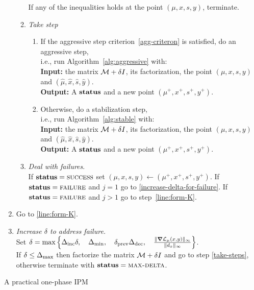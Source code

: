 \documentclass{article}
\begin{document}
\begin{algorithm}[H]
\begin{enumerate}[label*=A.{\arabic*}]
\begin{enumerate}[label*=.{\arabic*}]
If any of the inequalities \termination{} holds at the point $(\mu,x,s,y)$, terminate.
\item \emph{Take step}\label{line:take-step}
\begin{enumerate}[label=-Case {\Roman*}]
\item If the aggressive step criterion~\eqref{agg-criteron} is satisfied, do an aggressive step, \\
i.e., run Algorithm~\ref{alg:aggressive} with: \\
\hspace*{0.1cm}  \textbf{Input:} the matrix $\mathcal{M} + \delta I$, its factorization, the point $(\mu, x, s, y)$ and $(\hat{\mu}, \hat{x}, \hat{s}, \hat{y})$. \\
\hspace*{0.1cm}  \textbf{Output:} A $\textbf{status}$ and a new point $(\mu^{+},x^{+},s^{+},y^{+})$.
\item Otherwise, do a stabilization step, \\
i.e., run Algorithm~\ref{alg:stable} with: \\
\hspace*{0.1cm} \textbf{Input:} the matrix $\mathcal{M} + \delta I$, its factorization, the point $(\mu, x, s, y)$ and $(\hat{\mu}, \hat{x}, \hat{s}, \hat{y})$. \\
\hspace*{0.1cm} \textbf{Output:} A $\textbf{status}$ and a new point $(\mu^{+},x^{+},s^{+},y^{+})$.
\end{enumerate}
\item \emph{Deal with failures}. \\
If $\textbf{status} = \textsc{success}$ set $(\mu, x, s, y) \gets ( \mu^{+}, x^{+},s^{+},y^{+})$. If $\textbf{status} = \textsc{failure}$ and $j = 1$ go to \eqref{increase-delta-for-failure}.  If $\textbf{status} = \textsc{failure}$ and $j > 1$ go to step~\eqref{line:form-K}.
\end{enumerate}
\item 
Go to \eqref{line:form-K}.
\item \label{increase-delta-for-failure} \emph{Increase $\delta$ to address failure.} \\
Set $\delta = \max\left\{\Delta_{\text{inc}} \delta, \quad \Delta_{\min}, \quad \delta_{\text{prev}} \Delta_{\text{dec}}, \quad \frac{\| \grad \mathcal{L}_{\mu}(x,y) \|_{\infty}}{ \| d_{x} \|_{\infty} } \right\}$. \\
If $\delta \le \Delta_{\max}$ then factorize the matrix $\mathcal{M} + \delta I$ and go to step \eqref{take-steps}, otherwise terminate with $\textbf{status} = \textsc{max-delta}$.
\end{enumerate}
\caption{A practical one-phase IPM}\label{practical-one-phase-IPM}
\end{algorithm}
\end{document}
